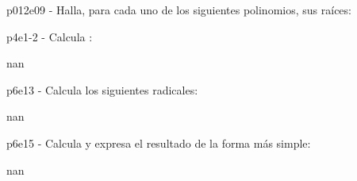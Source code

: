 \documentclass[addpoints,spanish, 12pt,a4paper]{exam}
\begin{document}
        \begin{questions}
        \question p012e09 - Halla, para cada uno  de los siguientes polinomios, sus raíces:
        \begin{multicols}{3.0} 
        \end{multicols}
        \question p4e1-2 - Calcula :
        \begin{multicols}{nan} 
        \end{multicols}
        \question p6e13 - Calcula los siguientes radicales:
        \begin{multicols}{nan} 
        \end{multicols}
        \question p6e15 - Calcula y expresa el resultado de la forma más simple:
        \begin{multicols}{nan} 
\end{multicols}
\end{questions}
\end{document}
